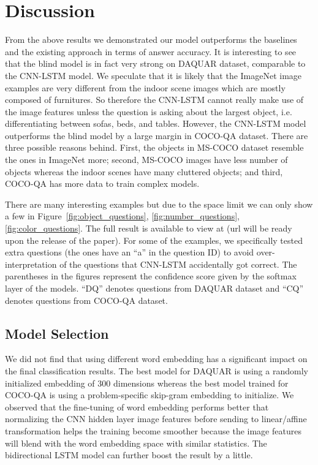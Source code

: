 \documentclass{article}
\renewcommand{\#}[1]{\textbf{#1}}
\begin{document}
\section{Discussion}
From the above results we demonstrated our model outperforms the baselines and the existing approach in terms of answer accuracy. It is interesting to see that the blind model is in fact very strong on DAQUAR dataset, comparable to the CNN-LSTM model. We speculate that it is likely that the ImageNet image examples are very different from the indoor scene images which are mostly composed of furnitures. So therefore the CNN-LSTM cannot really make use of the image features unless the question is asking about the largest object, i.e. differentiating between sofas, beds, and tables. However, the CNN-LSTM model outperforms the blind model by a large margin in COCO-QA dataset. There are three possible reasons behind. First, the objects in MS-COCO dataset resemble the ones in ImageNet more; second, MS-COCO images have less number of objects whereas the indoor scenes have many cluttered objects; and third, COCO-QA has more data to train complex models. 

There are many interesting examples but due to the space limit we can only show a few in Figure~\ref{fig:object_questions}, \ref{fig:number_questions}, \ref{fig:color_questions}. The full result is available to view at (url will be ready upon the release of the paper). For some of the examples, we specifically tested extra questions (the ones have an ``a'' in the question ID) to avoid over-interpretation of the questions that CNN-LSTM accidentally got correct. The parentheses in the figures represent the confidence score given by the softmax layer of the models. ``DQ'' denotes questions from DAQUAR dataset and ``CQ'' denotes questions from COCO-QA dataset.

\subsection{Model Selection}
We did not find that using different word embedding has a significant impact on the final classification results. The best model for DAQUAR is using a randomly initialized embedding of 300 dimensions whereas the best model trained for COCO-QA is using a problem-specific skip-gram embedding to initialize. We observed that the fine-tuning of word embedding performs better that normalizing the CNN hidden layer image features before sending to linear/affine transformation helps the training become smoother because the image features will blend with the word embedding space with similar statistics. The bidirectional LSTM model can further boost the result by a little.
\end{document}
